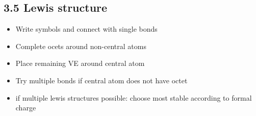 \subsection{3.5 Lewis structure}
    \begin{itemize}
        \itemsep0em
        \item Write symbols and connect with single bonds
        \item Complete ocets around non-central atoms
        \item Place remaining VE around central atom
        \item Try multiple bonds if central atom does not have octet
        \item if multiple lewis structures possible: choose most stable according to formal charge
        
    \end{itemize}